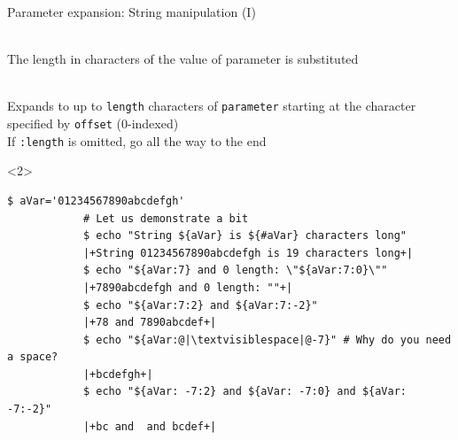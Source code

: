 \begin{frame}[fragile]{Parameter expansion: String manipulation (I)}
    \vspace{-2mm}
    \begin{description}
        \item[String Length:] \\
            {\small
                The length in characters of the value of parameter is substituted
            }
        \item[Substring Expansion:] \\
            {\small
                Expands to up to \texttt{length} characters of \texttt{parameter} starting at the character specified by \texttt{offset} (0-indexed)\\
                If \texttt{:length} is omitted, go all the way to the end\\[-0.5em]
            }
    \end{description}
    \begin{uncoverenv}<2>
        \begin{lstlisting}[style=MyBash, style=oddnumbers, aboveskip=2mm]
            $ aVar='01234567890abcdefgh'
            # Let us demonstrate a bit
            $ echo "String ${aVar} is ${#aVar} characters long"
            |+String 01234567890abcdefgh is 19 characters long+|
            $ echo "${aVar:7} and 0 length: \"${aVar:7:0}\""
            |+7890abcdefgh and 0 length: ""+|
            $ echo "${aVar:7:2} and ${aVar:7:-2}"
            |+78 and 7890abcdef+|
            $ echo "${aVar:@|\textvisiblespace|@-7}" # Why do you need a space?
            |+bcdefgh+|
            $ echo "${aVar: -7:2} and ${aVar: -7:0} and ${aVar: -7:-2}"
            |+bc and  and bcdef+|
        \end{lstlisting}
    \end{uncoverenv}
\end{frame}
